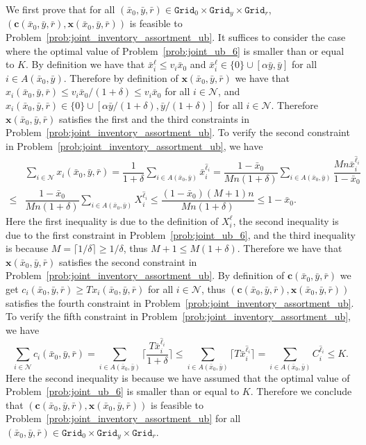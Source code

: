 \documentclass[mnsc,non-blindrev]{informs3}
\theoremstyle{definition}
\begin{document}
\begin{appendices}{\Large{}}
{We first prove that for all $(\bar{x}_0,\bar{y},\bar{r})\in \texttt{Grid}_0\times \texttt{Grid}_y\times \texttt{Grid}_r$, $(\bm{c}(\bar{x}_0,\bar{y},\bar{r}),\bm{x}(\bar{x}_0,\bar{y},\bar{r}))$ is feasible to Problem~\eqref{prob:joint_inventory_assortment_ub}. It suffices to consider the case where the optimal value of Problem~\eqref{prob:joint_ub_6} is smaller than or equal to $K$. By definition we have that $\bar{x}_i^\ell\leq v_i\bar{x}_0$ and $\bar{x}_i^\ell\in\{0\}\cup[\alpha\bar{y},\bar{y}]$ for all $i\in A(\bar{x}_0,\bar{y})$. Therefore by definition of $\bm{x}(\bar{x}_0,\bar{y},\bar{r})$ we have that $x_i(\bar{x}_0,\bar{y},\bar{r})\leq v_i\bar{x}_0/(1+\delta)\leq v_i\bar{x}_0$ for all $i\in\mathcal{N}$, and $x_i(\bar{x}_0,\bar{y},\bar{r})\in\{0\}\cup[\alpha\bar{y}/(1+\delta),\bar{y}/(1+\delta)]$ for all $i\in\mathcal{N}$. Therefore $\bm{x}(\bar{x}_0,\bar{y},\bar{r})$ satisfies the first and the third constraints in Problem~\eqref{prob:joint_inventory_assortment_ub}. To verify the second constraint in Problem~\eqref{prob:joint_inventory_assortment_ub}, we have
\begin{align*}
&\sum_{i\in\mathcal{N}}x_i(\bar{x}_0,\bar{y},\bar{r})=\dfrac{1}{1+\delta}\sum_{i\in A(\bar{x}_0,\bar{y})}\bar{x}_i^{\hat{\ell}_i}=\dfrac{1-\bar{x}_0}{Mn(1+\delta)}\sum_{i\in A(\bar{x}_0,\bar{y})}\dfrac{Mn\bar{x}_i^{\hat{\ell}_i}}{1-\bar{x}_0}\\
\leq&\dfrac{1-\bar{x}_0}{Mn(1+\delta)}\sum_{i\in A(\bar{x}_0,\bar{y})}X_i^{\hat{\ell}_i}\leq \dfrac{(1-\bar{x}_0)(M+1)n}{Mn(1+\delta)}\leq 1-\bar{x}_0.
\end{align*}
Here the first inequality is due to the definition of $X_i^\ell$, the second inequality is due to the first constraint in Problem~\eqref{prob:joint_ub_6}, and the third inequality is because $M=\lceil 1/\delta\rceil\geq 1/\delta$, thus $M+1\leq M(1+\delta)$. Therefore we have that $\bm{x}(\bar{x}_0,\bar{y},\bar{r})$ satisfies the second constraint in Problem~\eqref{prob:joint_inventory_assortment_ub}. By definition of $\bm{c}(\bar{x}_0,\bar{y},\bar{r})$ we get $c_i(\bar{x}_0,\bar{y},\bar{r})\geq Tx_i(\bar{x}_0,\bar{y},\bar{r})$ for all $i\in\mathcal{N}$, thus $(\bm{c}(\bar{x}_0,\bar{y},\bar{r}),\bm{x}(\bar{x}_0,\bar{y},\bar{r}))$ satisfies the fourth constraint in Problem~\eqref{prob:joint_inventory_assortment_ub}. To verify the fifth constraint in Problem~\eqref{prob:joint_inventory_assortment_ub}, we have
\begin{equation*}
\sum_{i\in\mathcal{N}}c_i(\bar{x}_0,\bar{y},\bar{r})=\sum_{i\in A(\bar{x}_0,\bar{y})} \Big\lceil\dfrac{T\bar{x}_i^{\hat{\ell}_i}}{1+\delta}\Big\rceil\leq \sum_{i\in A(\bar{x}_0,\bar{y})}\lceil T\bar{x}_i^{\hat{\ell}_i}\rceil=\sum_{i\in A(\bar{x}_0,\bar{y})} C_i^{\hat{\ell}_i}\leq K.
\end{equation*}
Here the second inequality is because we have assumed that the optimal value of Problem~\eqref{prob:joint_ub_6} is smaller than or equal to $K$. Therefore we conclude that $(\bm{c}(\bar{x}_0,\bar{y},\bar{r}),\bm{x}(\bar{x}_0,\bar{y},\bar{r}))$ is feasible to Problem~\eqref{prob:joint_inventory_assortment_ub} for all $(\bar{x}_0,\bar{y},\bar{r})\in\texttt{Grid}_0\times \texttt{Grid}_y\times \texttt{Grid}_r$.

}
\end{appendices}
\end{document}
